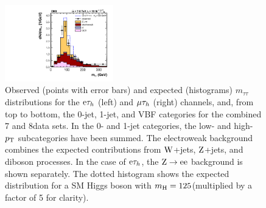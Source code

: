 \documentclass[12pt,twoside,a4paper,cmspaper,final,collab]{cms-tdr}
\begin{document}
\begin{figure}[htbp]
\begin{center}
\includegraphics[width=0.42\textwidth]{figures/htt/muTau_vbf_rescaled_7and8TeV.pdf}
\end{center}
\caption{Observed (points with error bars) and expected (histograms) $m_{\tau\tau}$ distributions for the $\mathrm{e}\tau_h$ (left) and $\mu\tau_h$ (right) channels, and,
from top to bottom, the 0-jet, 1-jet, and VBF categories for the combined 7 and 8\TeV data sets.
In the 0- and 1-jet categories, the low- and high-$p_{\mathrm{T}}$ subcategories have been summed.
The electroweak background combines the expected contributions from $\mathrm{W}$+jets, $\mathrm{Z}$+jets, and diboson processes.
In the case of $\mathrm{e}\tau_h$, the $\mathrm{Z}\to\mathrm{e}\mathrm{e}$ background is shown separately. The dotted histogram shows the expected distribution for a SM Higgs boson with $m_{\mathrm{H}}=125$\GeV (multiplied by a factor of 5 for clarity).
}
\label{fig:htt_mtt_leptau}
\end{figure}
\end{document}
